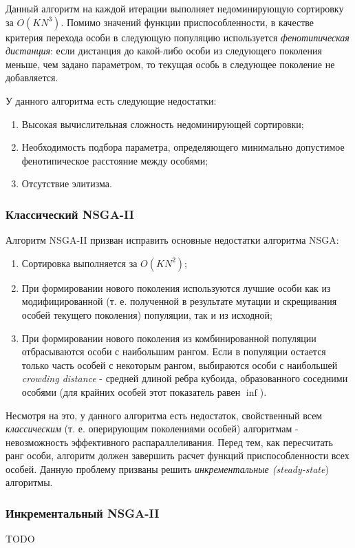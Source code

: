 Данный алгоритм на каждой итерации выполняет недоминирующую сортировку за $O(KN^3)$.
Помимо значений функции приспособленности, в качестве критерия перехода особи в следующую популяцию
используется \textit{фенотипическая дистанция}: если дистанция до какой-либо особи из следующего 
поколения меньше, чем задано параметром, то текущая особь в следующее поколение не добавляется. 
\cite{nsga1}

У данного алгоритма есть следующие недостатки: \cite{deb_nsga2}
\begin{enumerate}
\item Высокая вычислительная сложность недоминирующей сортировки;
\item Необходимость подбора параметра, определяющего минимально допустимое фенотипическое
	расстояние между особями;
\item Отсутствие элитизма.
\end{enumerate}

\subsubsection{Классический NSGA-II}
Алгоритм NSGA-II призван исправить основные недостатки алгоритма NSGA: \cite{deb_nsga2}
\begin{enumerate}
\item Сортировка выполняется за $O(KN^2)$;
\item При формировании нового поколения используются лучшие особи как из модифицированной
	(т. е. полученной в результате мутации и скрещивания особей текущего поколения) 
	популяции, так и из исходной;
\item При формировании нового поколения из комбинированной популяции отбрасываются особи
	с наибольшим рангом. Если в популяции остается только часть особей с некоторым рангом,
	выбираются особи с наибольшей \textit{crowding distance} - средней длиной ребра кубоида,
	образованного соседними особями (для крайних особей этот показатель равен $\inf$).
\end{enumerate}

Несмотря на это, у данного алгоритма есть недостаток, свойственный всем \textit{классическим}
(т. е. оперирующим поколениями особей) алгоритмам - невозможность эффективного распараллеливания.
Перед тем, как пересчитать ранг особи, алгоритм должен завершить расчет функций приспособленности 
всех особей. Данную проблему призваны решить \textit{инкрементальные (steady-state}) алгоритмы.
\cite{max_me_ss_nsga2}

\subsubsection{Инкрементальный NSGA-II}
TODO
